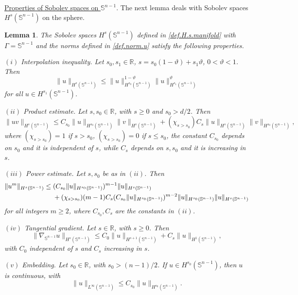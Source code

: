 \documentclass[10pt,reqno,a4paper]{article}
\numberwithin{equation}{section}
\theoremstyle{plain}
\newtheorem{lemma}[theorem]{Lemma}
\theoremstyle{definition}
\newcommand{\R}{{\mathbb R}}
\renewcommand{\S}{{\mathbb S}}
\renewcommand{\th}{\vartheta}
\newcommand{\grad}{\nabla}
\begin{document}
\medskip

\underline{Properties of Sobolev spaces on $\S^{n-1}$}. 
The next lemma deals with Sobolev spaces $H^s(\S^{n-1})$ on the sphere. 


\begin{lemma} \label{lemma:est.tools.S.n-1} 
The Sobolev spaces $H^s(\S^{n-1})$ defined in \eqref{def.H.s.manifold} 
with $\Gamma = \S^{n-1}$ and the norms defined in \eqref{def.norm.u} 
satisfy the following properties.

$(i)$ \emph{Interpolation inequality}. Let $s_0, s_1 \in \R$, 
$s = s_0 (1-\th) + s_1 \th$, $0 < \th < 1$. Then 
\begin{equation} \label{interpol.Hr.S2}
\| u \|_{H^s(\S^{n-1})} 
\leq \| u \|_{H^{s_0}(\S^{n-1})}^{1-\th} 
\| u \|_{H^{s_1}(\S^{n-1})}^\th
\end{equation}
for all $u \in H^{s_1}(\S^{n-1})$.  

$(ii)$ \emph{Product estimate}. Let $s, s_0 \in \R$, 
with $s \geq 0$ and $s_0 > d/2$. Then 
\begin{equation} \label{prod.est.unified.Hr.S2}
\| uv \|_{H^{s}(\S^{n-1})} 
\leq C_{s_0} \| u \|_{H^{s_0}(\S^{n-1})} \| v \|_{H^{s}(\S^{n-1})}
+ (\chi_{s > s_0}) C_s \| u \|_{H^{s}(\S^{n-1})} \| v \|_{H^{s_0}(\S^{n-1})},
\end{equation}
where $(\chi_{s > s_0}) = 1$ if $s > s_0$, 
$(\chi_{s > s_0}) = 0$ if $s \leq s_0$,
the constant $C_{s_0}$ depends on $s_0$ and it is independent of $s$, 
while $C_s$ depends on $s, s_0$ and it is increasing in $s$.  

$(iii)$ \emph{Power estimate}. Let $s, s_0$ be as in $(ii)$. Then 
\begin{align}  
\| u^m \|_{H^{s}(\S^{n-1})} 
& \leq ( C_{s_0} \| u \|_{H^{s_0}(\S^{n-1})} )^{m-1} \| u \|_{H^{s}(\S^{n-1})}  
\notag \\ & \quad \ 
+ (\chi_{s > s_0}) (m-1) C_s ( C_{s_0} \| u \|_{H^{s_0}(\S^{n-1})} )^{m-2} 
\| u \|_{H^{s_0}(\S^{n-1})} \| u \|_{H^{s}(\S^{n-1})}
\label{power.est.Hr.S2}
\end{align}
for all integers $m \geq 2$, 
where $C_{s_0}, C_s$ are the constants in $(ii)$.   

$(iv)$ \emph{Tangential gradient}. 
Let $s \in \R$, with $s \geq 0$. Then 
\begin{equation}  \label{est.grad.Hr.S2}
\| \grad_{\S^{n-1}} u \|_{H^s(\S^{n-1})} 
\leq C_0 \| u \|_{H^{s+1}(\S^{n-1})} + C_s \| u \|_{H^1(\S^{n-1})},
\end{equation} 
with $C_0$ independent of $s$ 
and $C_s$ increasing in $s$. 

$(v)$ \emph{Embedding}. 
Let $s_0 \in \R$, with $s_0 > (n-1)/2$. 
If $u \in H^{s_0}(\S^{n-1})$, then $u$ is continuous, with
\begin{equation} \label{embedding.Sd}
\| u \|_{L^\infty(\S^{n-1})} \leq C_{s_0} \| u \|_{H^{s_0}(\S^{n-1})}.
\end{equation} 
\end{lemma}
\end{document}
